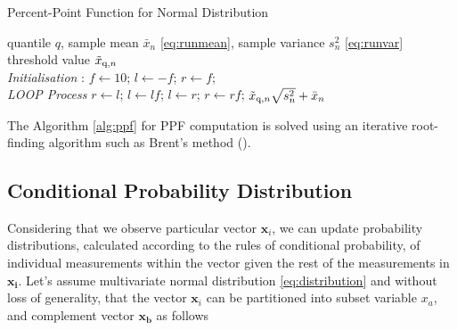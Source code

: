 \begin{algorithm}[H]
\caption{{Percent-Point Function for Normal Distribution}} \label{alg:ppf}
 \begin{algorithmic}[1]
 \renewcommand{\algorithmicrequire}{\textbf{Input:}}
 \renewcommand{\algorithmicensure}{\textbf{Output:}}
 \REQUIRE quantile $q$, sample mean $\bar x_n$ \eqref{eq:runmean}, sample variance $s^2_n$ \eqref{eq:runvar}
 \ENSURE threshold value $\tilde{x} _{\text{q}, n}$
 \\ \textit{Initialisation} :
 \STATE $f \leftarrow 10$; $l \leftarrow -f $; $r \leftarrow f;$
 \\ \textit{LOOP Process}
 \STATE $r \leftarrow l $;
 \STATE $l \leftarrow lf $;
 \ENDWHILE
 \STATE $l \leftarrow r $;
 \STATE $r \leftarrow rf $;
 \ENDWHILE
 \RETURN $\tilde{x} _{\text{q}, n} \sqrt{s^2_n} + \bar x_n $
 \end{algorithmic}
\end{algorithm}

The Algorithm \ref{alg:ppf} for PPF computation is solved using an iterative root-finding algorithm such as Brent's method (\cite{Brent72}).

\subsection{Conditional Probability Distribution}\label{AA:Conditional}
Considering that we observe particular vector $\boldsymbol{x}_i$, we can update probability distributions, calculated according to the rules of conditional probability, of individual measurements within the vector given the rest of the measurements in $\boldsymbol{x_{i}}$.
Let's assume multivariate normal distribution \eqref{eq:distribution} and without loss of generality, that the vector $\boldsymbol{x}_i$ can be partitioned into subset variable $x_a$, and complement vector $\boldsymbol{x_b}$ as follows


